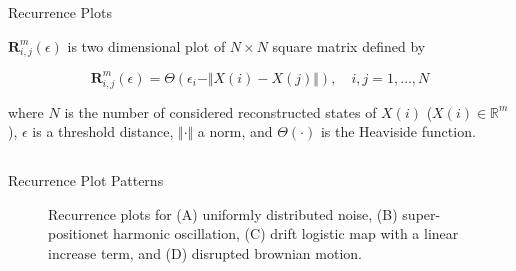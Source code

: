 {

\begin{frame}{Recurrence Plots}


$\mathbf{R}^{m}_{i,j} (\epsilon)$ is two dimensional plot of $N \times N$ square matrix
defined by

\begin{equation*}
\mathbf{R}^{m}_{i,j} (\epsilon) = 
\Theta ( \epsilon_i - \Vert X(i) - X(j) \Vert ), 
\quad i,j=1,\dots,N
\end{equation*}

where $N$ is the number of considered reconstructed states of $X(i)$
($X(i) \in \mathbb{R}^m$), 
$\epsilon$ is a threshold distance, 
$ \Vert  \cdot \Vert$ a norm, 
and $\Theta( \cdot )$ is the Heaviside function.

\end{frame}
}




\subsection{}
{

\begin{frame}{Recurrence Plot Patterns}
    \begin{figure}
	\caption{Recurrence plots for (A) uniformly distributed noise,
		(B) super-positionet harmonic oscillation,
		(C) drift logistic map with a linear increase term, and
		(D) disrupted brownian motion.
		} 
   \end{figure}
	
\end{frame}
}


